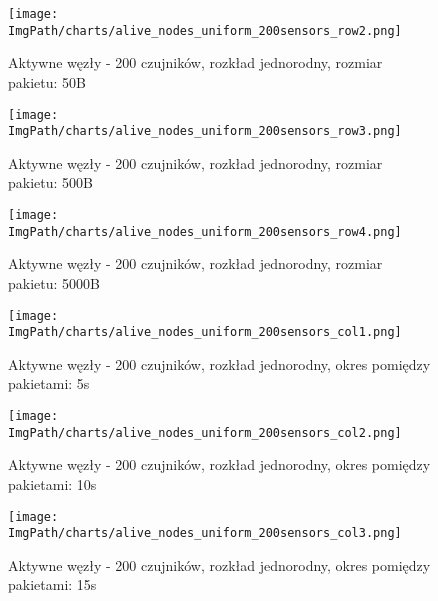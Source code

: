 \documentclass[a4paper,12pt,twoside,openany]{report}
\newcommand{\ImgPath}{./img}
\begin{document}
\begin{figure}[H]
	\begin{center}
		\texttt{[image: \\ImgPath/charts/alive\_nodes\_uniform\_200sensors\_row2.png]}
	\end{center}
	\caption{Aktywne węzły - 200 czujników, rozkład jednorodny, rozmiar pakietu: 50B}
\end{figure}

\begin{figure}[H]
	\begin{center}
		\texttt{[image: \\ImgPath/charts/alive\_nodes\_uniform\_200sensors\_row3.png]}
	\end{center}
	\caption{Aktywne węzły - 200 czujników, rozkład jednorodny, rozmiar pakietu: 500B}
\end{figure}

\begin{figure}[H]
	\begin{center}
		\texttt{[image: \\ImgPath/charts/alive\_nodes\_uniform\_200sensors\_row4.png]}
	\end{center}
	\caption{Aktywne węzły - 200 czujników, rozkład jednorodny, rozmiar pakietu: 5000B}
\end{figure}

\begin{figure}[H]
	\begin{center}
		\texttt{[image: \\ImgPath/charts/alive\_nodes\_uniform\_200sensors\_col1.png]}
	\end{center}
	\caption{Aktywne węzły - 200 czujników, rozkład jednorodny, okres pomiędzy pakietami: 5s}
\end{figure}

\begin{figure}[H]
	\begin{center}
		\texttt{[image: \\ImgPath/charts/alive\_nodes\_uniform\_200sensors\_col2.png]}
	\end{center}
	\caption{Aktywne węzły - 200 czujników, rozkład jednorodny, okres pomiędzy pakietami: 10s}
\end{figure}

\begin{figure}[H]
	\begin{center}
		\texttt{[image: \\ImgPath/charts/alive\_nodes\_uniform\_200sensors\_col3.png]}
	\end{center}
	\caption{Aktywne węzły - 200 czujników, rozkład jednorodny, okres pomiędzy pakietami: 15s}
\end{figure}
\end{document}
